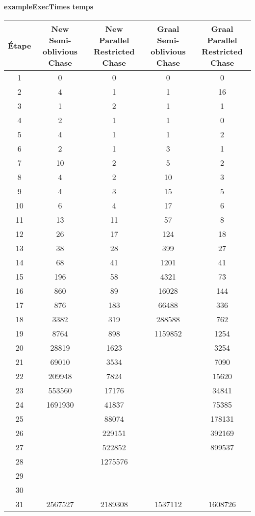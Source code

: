 \paragraph{exampleExecTimes temps}
\begin{center}
\begin{tabular}{|c||c|c|c|c|}
    \hline
    Étape & \shortstack{New \\ Semi-oblivious Chase} & \shortstack{New \\ Parallel Restricted Chase} & \shortstack{Graal \\ Semi-oblivious Chase} & \shortstack{Graal \\ Parallel Restricted Chase} \\
    \hline
     \hline
1&0&	0&					0&	0 \\
     \hline
2&4&	1&					1&	16\\
     \hline
3&1&	2&					1&	1\\
     \hline
4&2&	1&					1&	0\\
     \hline
5&4&	1&					1&	2\\
     \hline
6&2&	1&					3&	1\\
     \hline
7&10&	2&					5&	2\\
     \hline
8&4&	2&					10&	3\\
     \hline
9&4&	3&					15&	5\\
     \hline
10&6&	4&					17&	6\\
     \hline
11&13&	11&					57&	8\\
     \hline
12&26&	17&					124&	18\\
     \hline
13&38&	28&					399&	27\\
     \hline
14&68&	41&					1201&	41\\
     \hline
15&196&	58&					4321&	73\\
     \hline
16&860&	89&					16028&	144\\
     \hline
17&876&	183&					66488&	336\\
     \hline
18&3382&	319&					288588&	762\\
     \hline
19&8764&	898	&				1159852&	1254\\
     \hline
20&28819&	1623&		&				3254\\
     \hline
21&69010&	3534&		&				7090\\
     \hline
22&209948&	7824&		&				15620\\
     \hline
23&553560&	17176&		&				34841\\
     \hline
24&1691930&	41837&		&				75385\\
     \hline
25&&	88074&			&			178131\\
     \hline
26&&	229151&			&			392169\\
     \hline
27&&	522852&			&			899537\\
     \hline
28&&	1275576&		&				\\
     \hline
29&		&		&		&	\\
     \hline
30&		&		&		&	\\
     \hline
31&2567527&	2189308&					1537112&	1608726\\
     \hline
\end{tabular}
\end{center}